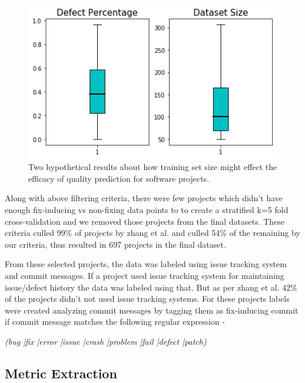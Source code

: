 \documentclass[sigconf]{acmart}
\theoremstyle{break}
\begin{document}
\begin{figure}
    \centering
    \includegraphics[width=\linewidth]{figs/meta.png}
    \caption{Two hypothetical results about how training set size might effect the efficacy of quality prediction for software projects.}
    \label{fig:meta}
\end{figure}


Along with above filtering criteria, there were few projects which didn't have enough fix-inducing vs non-fixing data points to to create a stratified k=5 fold cross-validation and we removed those projects from the final datasets. These criteria culled 99\% of projects by zhang et al. and culled 54\% of the remaining by our criteria, thus resulted in 697 projects in the final dataset.

From these selected projects, the data was labeled using issue tracking system and commit messages. If a project used issue tracking system for maintaining issue/defect history the data was labeled using that. But as per zhang et al. 42\% of the projects didn't not used issue tracking systems. For these projects labels were created analyzing commit messages by tagging them as fix-inducing commit if commit message matches the following regular expression - 

\begin{center}
\textit{(bug |fix |error |issue |crash |problem |fail |defect |patch)}
\end{center}
 

\subsection{Metric Extraction}
\label{sec:Metric Extraction}
\end{document}
